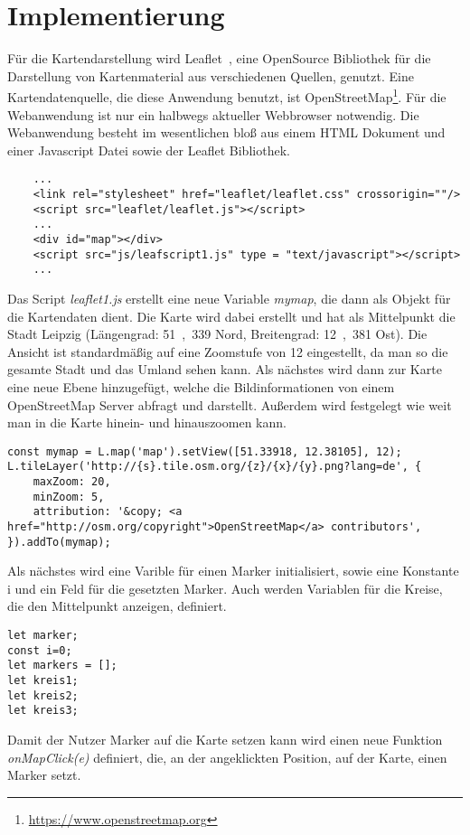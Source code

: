\documentclass[a4paper, twoside, 12pt]{scrreprt}
\begin{document}
\chapter{Implementierung}
Für die Kartendarstellung wird Leaflet~\citep{crickard2014leaflet}, eine OpenSource Bibliothek für die Darstellung von Kartenmaterial aus verschiedenen Quellen, genutzt. Eine Kartendatenquelle, die diese Anwendung benutzt, ist OpenStreetMap\footnote{\url{https://www.openstreetmap.org}}.
Für die Webanwendung ist nur ein halbwegs aktueller Webbrowser notwendig.
Die Webanwendung besteht im wesentlichen bloß aus einem HTML Dokument und einer Javascript Datei sowie der Leaflet Bibliothek.
\begin{lstlisting}
	...
	<link rel="stylesheet" href="leaflet/leaflet.css" crossorigin=""/>
	<script src="leaflet/leaflet.js"></script>
	...
	<div id="map"></div>
	<script src="js/leafscript1.js" type = "text/javascript"></script>
	...
\end{lstlisting}
Das Script \textit{leaflet1.js} erstellt eine neue Variable \textit{mymap}, die dann als Objekt für die Kartendaten dient.
Die Karte wird dabei erstellt und hat als Mittelpunkt die Stadt Leipzig (Längengrad: \si{51{,}339}{\textdegree}  Nord, Breitengrad: \si{12{,}381}{\textdegree}  Ost). Die Ansicht ist standardmäßig auf eine Zoomstufe von 12 eingestellt, da man so die gesamte Stadt und das Umland sehen kann.
Als nächstes wird dann zur Karte eine neue Ebene hinzugefügt, welche die Bildinformationen von einem OpenStreetMap Server abfragt und darstellt.
Außerdem wird festgelegt wie weit man in die Karte hinein- und hinauszoomen kann.
\lstset{language=Java}
\begin{lstlisting}
const mymap = L.map('map').setView([51.33918, 12.38105], 12);
L.tileLayer('http://{s}.tile.osm.org/{z}/{x}/{y}.png?lang=de', {
	maxZoom: 20,
	minZoom: 5,
	attribution: '&copy; <a href="http://osm.org/copyright">OpenStreetMap</a> contributors',
}).addTo(mymap);
\end{lstlisting}
Als nächstes wird eine Varible für einen Marker initialisiert, sowie eine Konstante i und ein Feld für die gesetzten Marker. Auch werden Variablen für die Kreise, die den Mittelpunkt anzeigen, definiert.
\begin{lstlisting}
let marker;
const i=0;
let markers = [];
let kreis1;
let kreis2;
let kreis3;
\end{lstlisting}
Damit der Nutzer Marker auf die Karte setzen kann wird einen neue Funktion \textit{onMapClick(e)} definiert, die, an der angeklickten Position, auf der Karte, einen Marker setzt.
\end{document}
